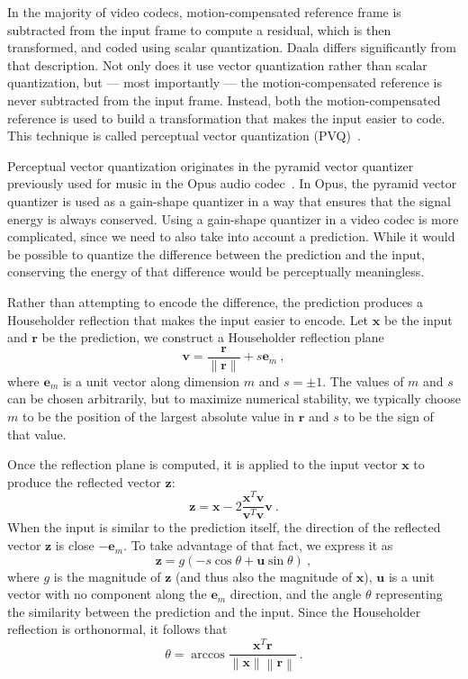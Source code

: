 \documentclass[english,conference,10pt]{IEEEtran}
\begin{document}
In the majority of video codecs, motion-compensated reference frame
is subtracted from the input frame to compute a residual, which is
then transformed, and coded using scalar quantization. Daala differs
significantly from that description. Not only does it use vector quantization
rather than scalar quantization, but --- most importantly --- the motion-compensated
reference is never subtracted from the input frame. Instead, both
the motion-compensated reference is used to build a transformation
that makes the input easier to code. This technique is called perceptual
vector quantization (PVQ)~\cite{valin2015spie}.

Perceptual vector quantization originates in the pyramid vector quantizer
previously used for music in the Opus audio codec~\cite{ValinAES}. In Opus,
the pyramid vector quantizer is used as a gain-shape quantizer in a way that
ensures that the signal energy is always conserved. Using a gain-shape
quantizer in a video codec is more complicated, since we need to also take
into account a prediction. While it would be possible to quantize the difference
between the prediction and the input, conserving the energy of that
difference would be perceptually meaningless.

Rather than attempting to encode the difference, the prediction produces
a Householder reflection that makes the input easier to encode. Let
$\mathbf{x}$ be the input and $\mathbf{r}$ be the prediction, we construct
 a Householder reflection plane
\begin{equation}
\mathbf{v} = \frac{\mathbf{r}}{\|\mathbf{r}\|} + s\mathbf{e}_m\ ,
\end{equation}
where $\mathbf{e}_m$ is a unit vector along dimension $m$ and $s = \pm1$.
The values of $m$ and $s$ can be chosen arbitrarily, but to maximize
numerical stability, we typically choose $m$ to be the position of the
largest absolute value in $\mathbf{r}$ and $s$ to be the sign of that value.

Once the reflection plane is computed, it is applied to the input vector
$\mathbf{x}$ to produce the reflected vector $\mathbf{z}$:
\begin{equation}
\mathbf{z} = \mathbf{x} - 2\frac{\mathbf{x}^T\mathbf{v}}
{\mathbf{v}^T\mathbf{v}}\mathbf{v}\ .
\end{equation}
When the input is similar to the prediction itself, the direction of the
reflected vector $\mathbf{z}$ is close $-\mathbf{e}_m$. To take advantage of
that fact, we express it as
\begin{equation}
\mathbf{z} = g\left(-s\cos\theta + \mathbf{u}\sin\theta\right)\ ,
\end{equation}
where $g$ is the magnitude of $\mathbf{z}$ (and thus also the magnitude of
$\mathbf{x}$), $\mathbf{u}$ is a unit vector with no component along the
$\mathbf{e}_m$ direction, and the angle $\theta$ representing the
similarity between the prediction and the input. Since the Householder
reflection is orthonormal, it follows that
\begin{equation}
\theta = \arccos\frac{\mathbf{x}^T\mathbf{r}}
                   {\left\|\mathbf{x}\right\|\left\|\mathbf{r}\right\|}\ .
\end{equation}
\end{document}

